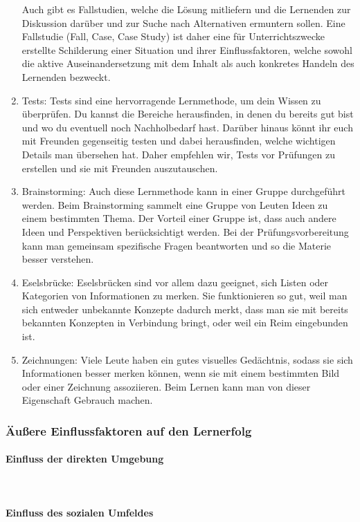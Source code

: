 \begin{enumerate}
Auch gibt es Fallstudien, welche die Lösung mitliefern und die Lernenden zur Diskussion darüber und zur Suche nach Alternativen ermuntern sollen.  Eine Fallstudie (Fall, Case, Case Study) ist daher eine für Unterrichtszwecke erstellte Schilderung einer Situation und ihrer Einflussfaktoren, welche sowohl die aktive Auseinandersetzung mit dem Inhalt als auch konkretes Handeln des Lernenden bezweckt.
	\item Tests: Tests sind eine hervorragende Lernmethode, um dein Wissen zu überprüfen. 
Du kannst die Bereiche herausfinden, in denen du bereits gut bist und wo du eventuell noch Nachholbedarf hast. Darüber hinaus könnt ihr euch mit Freunden gegenseitig testen und dabei herausfinden, welche wichtigen Details man übersehen hat. Daher empfehlen wir, Tests vor Prüfungen zu erstellen und sie mit Freunden auszutauschen.
	\item Brainstorming: Auch diese Lernmethode kann in einer Gruppe durchgeführt werden. 
Beim Brainstorming sammelt eine Gruppe von Leuten Ideen zu einem bestimmten Thema. Der Vorteil einer Gruppe ist, dass auch andere Ideen und Perspektiven berücksichtigt werden. Bei der Prüfungsvorbereitung kann man gemeinsam spezifische Fragen beantworten und so die Materie besser verstehen.
	\item Eselsbrücke: Eselsbrücken sind vor allem dazu geeignet, sich Listen oder Kategorien von Informationen zu merken. Sie funktionieren so gut, weil man sich entweder unbekannte Konzepte dadurch merkt, dass man sie mit bereits bekannten Konzepten in Verbindung bringt, oder weil ein Reim eingebunden ist.
	\item Zeichnungen: Viele Leute haben ein gutes visuelles Gedächtnis, sodass sie sich Informationen besser merken können, wenn sie mit einem bestimmten Bild oder einer Zeichnung assoziieren. Beim Lernen kann man von dieser Eigenschaft Gebrauch machen.
\end{enumerate} 

\subsubsection{Äußere Einflussfaktoren auf den Lernerfolg}
\paragraph{Einfluss der direkten Umgebung}~\\
\paragraph{Einfluss des sozialen Umfeldes}~\\
